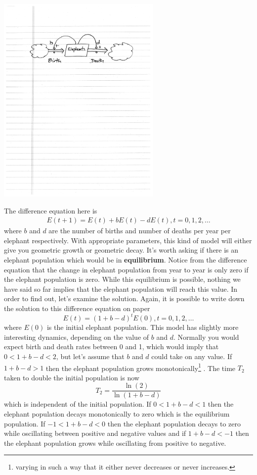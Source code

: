 \centerline{\includegraphics[width=8cm]{figs/first_order_model}}

The difference equation here is
\begin{eqnarray*}
E(t+1) = E(t) + bE(t) - dE(t), t = 0,1,2,\ldots
\end{eqnarray*}
where $b$ and $d$ are the number of births and number of deaths per year per elephant respectively. With appropriate parameters, this kind of model will either give you geometric growth or geometric decay. It's worth asking if there is an elephant population which would be in {\bf equilibrium}. Notice from the difference equation that the change in elephant population from year to year is only zero if the elephant population is zero. While this equilibrium is possible, nothing we have said so far implies that the elephant population will reach this value. In order to find out, let's examine the solution. Again, it is possible to write down the solution to this difference equation on paper
$$E(t) = (1+b-d)^t E(0), t = 0,1,2,\ldots $$
where $E(0)$ is the initial elephant population. This model has slightly more interesting dynamics, depending on the value of $b$ and $d$. Normally you would expect birth and death rates between 0 and 1, which would imply that $0<1+b-d<2$, but let's assume that $b$ and $d$ could take on any value. If $1+b-d > 1$ then the elephant population grows monotonically\footnote{varying in such a way that it either never decreases or never increases.}
. The time $T_2$ taken to double the initial population is now
$$ T_2 = \frac{\ln(2)}{\ln(1+b-d)} $$
which is independent of the initial population. If $0 < 1+b-d < 1$ then the elephant population decays monotonically to zero which is the equilibrium population. If $-1 < 1+b-d<0$ then the elephant population decays to zero while oscillating between positive and negative values and if $1+b-d < -1$ then the elephant population grows while oscillating from positive to negative.

